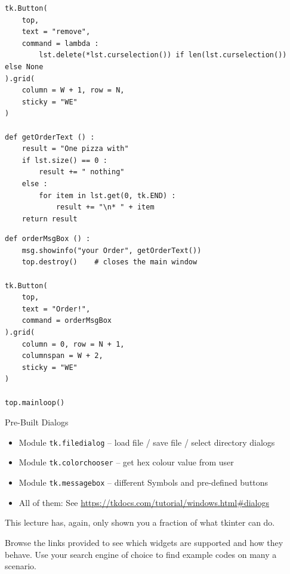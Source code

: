 \begin{frame}[fragile]
%
\begin{codebox}
\begin{verbatim}
tk.Button(
    top,
    text = "remove",
    command = lambda :
        lst.delete(*lst.curselection()) if len(lst.curselection()) else None
).grid(
    column = W + 1, row = N,
    sticky = "WE"
)

def getOrderText () :
    result = "One pizza with"
    if lst.size() == 0 :
        result += " nothing"
    else :
        for item in lst.get(0, tk.END) :
            result += "\n* " + item
    return result
\end{verbatim}
\end{codebox}
%
\end{frame}


\begin{frame}[fragile]
%
\begin{codebox}
\begin{verbatim}
def orderMsgBox () :
    msg.showinfo("your Order", getOrderText())
    top.destroy()    # closes the main window

tk.Button(
    top,
    text = "Order!",
    command = orderMsgBox
).grid(
    column = 0, row = N + 1,
    columnspan = W + 2,
    sticky = "WE"
)

top.mainloop()
\end{verbatim}
\end{codebox}
%
\end{frame}


\begin{frame}[fragile]{Pre-Built Dialogs}
%
\begin{itemize}
\item Module \texttt{tk.filedialog} -- load file / save file / select directory dialogs
\item Module \texttt{tk.colorchooser} -- get hex colour value from user
\item Module \texttt{tk.messagebox} -- different Symbols and pre-defined buttons
\item All of them: See \url{https://tkdocs.com/tutorial/windows.html#dialogs}
\end{itemize}
%
\begin{hintbox}
This lecture has, again, only shown you a fraction of what tkinter can do.

Browse the links provided to see which widgets are supported and how they behave. Use your search engine of choice to find example codes on many a scenario.
\end{hintbox}
%
\end{frame}


